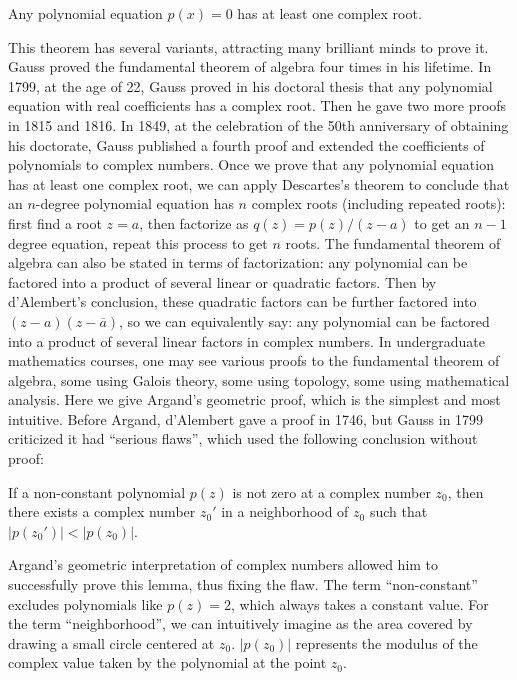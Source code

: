 \documentclass[b5paper]{article}
\begin{document}
\begin{theorem}
Any polynomial equation $p(x) = 0$ has at least one complex root.
\end{theorem}

This theorem has several variants, attracting many brilliant minds to prove it. Gauss proved the fundamental theorem of algebra four times in his lifetime. In 1799, at the age of 22, Gauss proved in his doctoral thesis that any polynomial equation with real coefficients has a complex root. Then he gave two more proofs in 1815 and 1816. In 1849, at the celebration of the 50th anniversary of obtaining his doctorate, Gauss published a fourth proof and extended the coefficients of polynomials to complex numbers. Once we prove that any polynomial equation has at least one complex root, we can apply Descartes's theorem to conclude that an $n$-degree polynomial equation has $n$ complex roots (including repeated roots): first find a root $z = a$, then factorize as $q(z) = p(z)/(z - a)$ to get an $n-1$ degree equation, repeat this process to get $n$ roots. The fundamental theorem of algebra can also be stated in terms of factorization: any polynomial can be factored into a product of several linear or quadratic factors. Then by d'Alembert's conclusion, these quadratic factors can be further factored into $(z - a)(z - \overline{a})$, so we can equivalently say: any polynomial can be factored into a product of several linear factors in complex numbers. In undergraduate mathematics courses, one may see various proofs to the fundamental theorem of algebra, some using Galois theory, some using topology, some using mathematical analysis. Here we give Argand's geometric proof, which is the simplest and most intuitive. Before Argand, d'Alembert gave a proof in 1746, but Gauss in 1799 criticized it had \enquote{serious flaws}, which used the following conclusion without proof:

\begin{lemma}[d'Alembert]
If a non-constant polynomial $p(z)$ is not zero at a complex number $z_0$, then there exists a complex number $z_0'$ in a neighborhood of $z_0$ such that $|p(z_0')| < |p(z_0)|$.
\end{lemma}

Argand's geometric interpretation of complex numbers allowed him to successfully prove this lemma, thus fixing the flaw. The term \enquote{non-constant} excludes polynomials like $p(z) = 2$, which always takes a constant value. For the term \enquote{neighborhood}, we can intuitively imagine as the area covered by drawing a small circle centered at $z_0$. $|p(z_0)|$ represents the modulus of the complex value taken by the polynomial at the point $z_0$.
\end{document}

